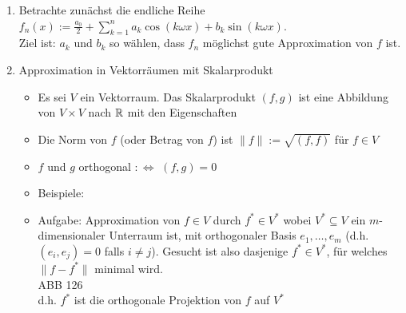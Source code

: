 \begin{enumerate}
\item Betrachte zunächst die endliche Reihe $f_n(x):= \frac{a_0}{2}+\sum_{k=1}^n a_k \cos (k\omega x) + b_k \sin (k \omega x )$.\\
Ziel ist: $a_k$ und $b_k$ so wählen, dass $f_n$ möglichst gute Approximation von $f$ ist.
\item Approximation in Vektorräumen mit Skalarprodukt
\begin{itemize}
\item Es sei $V$ ein Vektorraum. Das Skalarprodukt $(f,g)$ ist eine Abbildung von $V\times V$ nach $\mathbb{R}$ mit den Eigenschaften 
\item Die Norm von $f$ (oder Betrag von $f$) ist $\|f\|:= \sqrt{(f,f)}$ für $f\in V$
\item $f$ und $g$ orthogonal $:\Leftrightarrow$ $(f,g) = 0$
\item Beispiele:
\item Aufgabe: Approximation von $f\in V$ durch $f^*\in V^*$ wobei $V^*\subseteq V$ ein $m$-dimensionaler Unterraum ist, mit orthogonaler Basis $e_1,\dots,e_m$ (d.h. $(e_i, e_j) = 0 $ falls $i\not = j$). Gesucht ist also dasjenige $f^* \in V^*$, für welches $\| f - f^* \|$ minimal wird.\\
ABB 126\\
d.h. $f^*$ ist die orthogonale Projektion von $f$ auf $V^*$

\end{itemize}
\end{enumerate}
